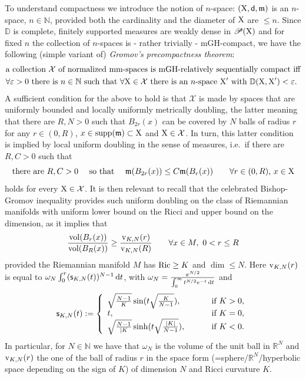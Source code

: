 \documentclass[11pt]{article}
\numberwithin{equation}{section}
\newcommand{\N}{\mathbb{N}}
\newcommand{\R}{\mathbb{R}}
\newcommand{\pr}{\mathscr P}
\newcommand{\X}{{\rm X}}
\newcommand{\sfd}{{\sf d}}
\newcommand{\mm}{{\mathfrak m}}
\newcommand{\vol}{{\rm vol}}								%
\renewcommand{\d}{{\rm d}}
\newcommand{\supp}{{\rm supp}}
\newcommand{\eps}{\varepsilon}
\begin{document}
To understand  compactness we introduce the notion of $n$-space: $(\X,\sfd,\mm)$ is an $n$-space, $n\in\N$, provided both the cardinality and the diameter of $\X$ are $\leq n$. Since $\mathbb D$ is complete, finitely supported measures are weakly dense in $\pr(\X)$ and for fixed $n$ the collection of $n$-spaces is - rather trivially  - mGH-compact, we have the following (simple variant of) \emph{Gromov's precompactness theorem}:
\[
\begin{split}
&\text{a collection $\mathcal X$ of normalized mm-spaces is mGH-relatively sequentially compact iff} \\
&\text{$\forall \eps>0$ there is $n\in\N$ such that $\forall \X\in \mathcal X$ there is an $n$-space $\X'$ with $\mathbb D(\X,\X')<\eps$}.
\end{split}
\]
A sufficient condition for the above to hold is that $\mathcal X$ is made by spaces that are uniformly bounded and locally uniformly metrically doubling, the latter meaning that there are $R,N>0$ such that $B_{2r}(x)$ can be covered by $N$ balls of radius $r$ for any $r\in(0,R)$, $x\in\supp(\mm)\subset\X$ and $\X\in\mathcal X$. In turn, this latter condition is implied by local uniform doubling in the sense of measures, i.e.\ if there are $R,C>0$ such that 
\begin{equation}
\label{eq:doubmeas}
\text{there are $R,C>0\quad$ so that $\quad \mm(B_{2r}(x))\leq C\mm(B_r(x))\qquad \forall r\in(0,R)$, $x\in\X$}
\end{equation}
holds for every  $\X\in\mathcal X$.
It is then relevant to recall that the celebrated Bishop-Gromov inequality provides such uniform doubling on the class of Riemannian manifolds with uniform lower bound on the Ricci and upper bound on the dimension, as it implies that
\[
\frac{\vol(B_r(x))}{\vol(B_R(x))}\geq \frac{{\rm v}_{K,N}(r)}{{\rm v}_{K,N}(R)}\qquad\forall x\in M, \ 0< r\leq R
\]
provided the Riemannian manifold $M$ has ${\rm Ric}\geq K$ and $\dim\leq N$. Here ${\rm v}_{K,N}(r)$ is equal to $\omega_N\int_0^r({\sf s}_{K,N}(t))^{N-1}\,\d t$,  with $\omega_N=\frac{\pi^{ N/2}}{\int_0^\infty t^{N/2}e^{-t}\,\d t}$ and
\[
{\sf s}_{K,N}(t):=\left\{\begin{array}{ll}
\sqrt{\tfrac{N-1}K}\sin(t\sqrt{\tfrac K{N-1}}),&\qquad\text{ if }K>0,\\
t,&\qquad\text{ if }K=0,\\
\sqrt{\tfrac{N-1}{|K}}\sinh(t\sqrt{\tfrac {|K|}{N-1}}),&\qquad\text{ if }K<0.
\end{array}\right.
\]
In particular, for  $N\in\N$ we have that $\omega_N$ is the volume of the unit ball in $\R^N$ and ${\rm v}_{K,N}(r)$  the one of the ball of radius $r$ in the space form (=sphere/$\R^N$/hyperbolic space depending on the sign of $K$) of dimension $N$ and  Ricci curvature $K$.
\end{document}

